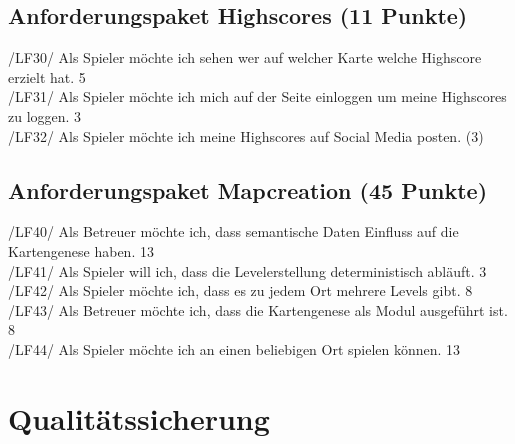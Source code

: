 \documentclass[11pt,a4paper]{article}
\begin{document}
\subsection{Anforderungspaket Highscores (11 Punkte)}

/LF30/ Als Spieler möchte ich sehen wer auf
welcher Karte welche Highscore erzielt hat. 5\\
/LF31/ Als Spieler möchte ich mich auf der
Seite einloggen um meine Highscores zu
loggen. 3\\
/LF32/ Als Spieler möchte ich meine
Highscores auf Social Media posten. (3)\\

\subsection{Anforderungspaket Mapcreation (45 Punkte)}

/LF40/ Als Betreuer möchte ich, dass
semantische Daten Einfluss auf die
Kartengenese haben. 13\\
/LF41/ Als Spieler will ich, dass die
Levelerstellung deterministisch abläuft. 3\\
/LF42/ Als Spieler möchte ich, dass es zu
jedem Ort mehrere Levels gibt. 8\\
/LF43/ Als Betreuer möchte ich, dass die
Kartengenese als Modul ausgeführt ist. 8
\\
/LF44/ Als Spieler möchte ich an einen
beliebigen Ort spielen können. 13\\

\section{Qualitätssicherung}
\end{document}
